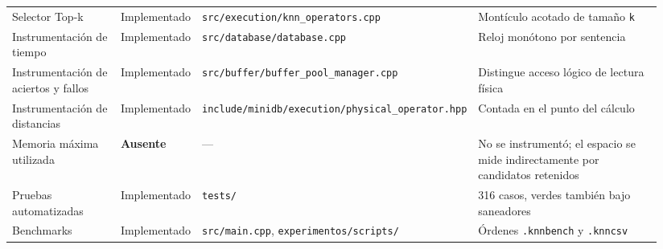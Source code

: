 \documentclass[11pt,a4paper]{article}
\begin{document}
\begin{landscape}
\begin{longtable}[]{@{}L{0.18\linewidth}L{0.12\linewidth}L{0.28\linewidth}L{0.36\linewidth}@{}}
Selector Top-k & Implementado &
\texttt{src/execution/knn\_operators.cpp} & Montículo acotado de tamaño
\texttt{k} \\
Instrumentación de tiempo & Implementado &
\texttt{src/database/database.cpp} & Reloj monótono por sentencia \\
Instrumentación de aciertos y fallos & Implementado &
\texttt{src/buffer/buffer\_pool\_manager.cpp} & Distingue acceso lógico
de lectura física \\
Instrumentación de distancias & Implementado &
\texttt{include/minidb/execution/physical\_operator.hpp} & Contada en el
punto del cálculo \\
Memoria máxima utilizada & \textbf{Ausente} & --- & No se instrumentó;
el espacio se mide indirectamente por candidatos retenidos \\
Pruebas automatizadas & Implementado & \texttt{tests/} & 316 casos,
verdes también bajo saneadores \\
Benchmarks & Implementado & \texttt{src/main.cpp},
\texttt{experimentos/scripts/} & Órdenes \texttt{.knnbench} y
\texttt{.knncsv} \\
\end{longtable}
\end{landscape}
\end{document}
